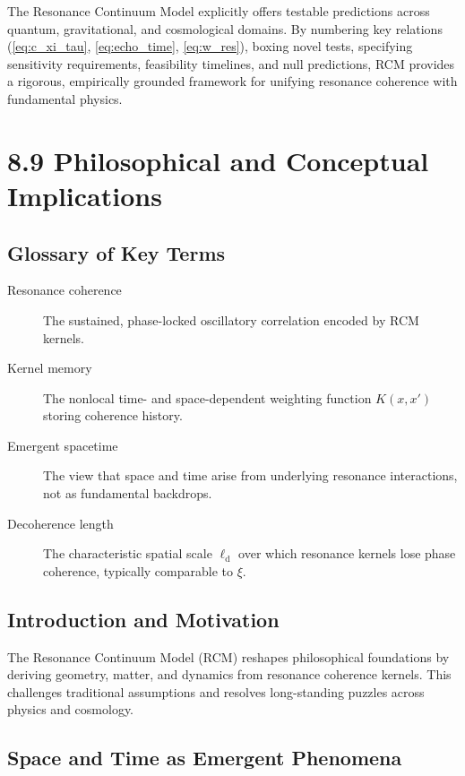 The Resonance Continuum Model explicitly offers testable predictions across quantum, gravitational, and cosmological domains. By numbering key relations (\ref{eq:c_xi_tau}, \ref{eq:echo_time}, \ref{eq:w_res}), boxing novel tests, specifying sensitivity requirements, feasibility timelines, and null predictions, RCM provides a rigorous, empirically grounded framework for unifying resonance coherence with fundamental physics.


\section{8.9 Philosophical and Conceptual Implications}

\subsection*{Glossary of Key Terms}
\begin{description}
  \item[Resonance coherence] The sustained, phase-locked oscillatory correlation encoded by RCM kernels.
  \item[Kernel memory] The nonlocal time- and space-dependent weighting function \(K(x,x')\) storing coherence history.
  \item[Emergent spacetime] The view that space and time arise from underlying resonance interactions, not as fundamental backdrops.
  \item[Decoherence length] The characteristic spatial scale \(\ell_{\mathrm{d}}\) over which resonance kernels lose phase coherence, typically comparable to \(\xi\).
\end{description}

\subsection*{Introduction and Motivation}

The Resonance Continuum Model (RCM) reshapes philosophical foundations by deriving geometry, matter, and dynamics from resonance coherence kernels. This challenges traditional assumptions and resolves long-standing puzzles across physics and cosmology.

\subsection*{Space and Time as Emergent Phenomena}

